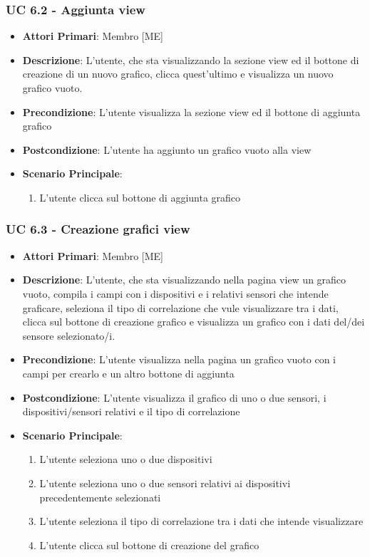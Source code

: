			\subsubsection{UC 6.2 - Aggiunta view}
			\begin{itemize}
				\item \textbf{Attori Primari}: Membro [ME]
				\item \textbf{Descrizione}: L'utente, che sta visualizzando la sezione view ed il bottone di creazione di un nuovo grafico, clicca quest'ultimo e visualizza un nuovo grafico vuoto.
				\item \textbf{Precondizione}: L'utente visualizza la sezione view ed il bottone di aggiunta grafico
				\item \textbf{Postcondizione}: L'utente ha aggiunto un grafico vuoto alla view
				\item \textbf{Scenario Principale}:
				\begin{enumerate}
					\item{L'utente clicca sul bottone di aggiunta grafico}
				\end{enumerate}	
			\end{itemize}

			\subsubsection{UC 6.3 - Creazione grafici view}
			\begin{itemize}
				\item \textbf{Attori Primari}: Membro [ME]
				\item \textbf{Descrizione}: L'utente, che sta visualizzando nella pagina view un grafico vuoto, compila i campi con i dispositivi e i relativi sensori che intende graficare, seleziona il tipo di correlazione che vule visualizzare tra i dati, clicca sul bottone di creazione grafico e visualizza un grafico con i dati del/dei sensore selezionato/i.
				\item \textbf{Precondizione}: L'utente visualizza nella pagina un grafico vuoto con i campi per crearlo e un altro bottone di aggiunta
				\item \textbf{Postcondizione}: L'utente visualizza il grafico di uno o due sensori, i dispositivi/sensori relativi e il tipo di correlazione 
				\item \textbf{Scenario Principale}:
				\begin{enumerate}
					\item{L'utente seleziona uno o due dispositivi}
					\item{L'utente seleziona uno o due sensori relativi ai dispositivi precedentemente selezionati}
					\item{L'utente seleziona il tipo di correlazione tra i dati che intende visualizzare}
					\item{L'utente clicca sul bottone di creazione del grafico}
				\end{enumerate}	
			\end{itemize}

